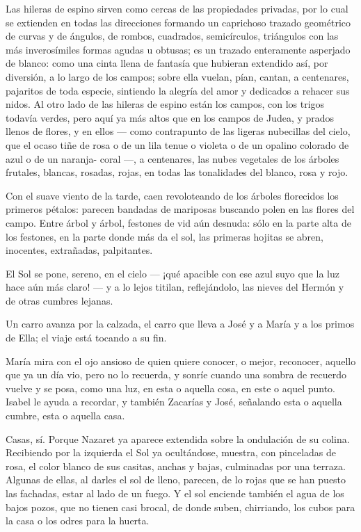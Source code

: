 \documentclass[12pt, twoside, openright]{book} %
\begin{document}
Las hileras de espino sirven como cercas de las propiedades privadas, por lo cual se extienden en todas las direcciones formando un caprichoso trazado geométrico de curvas y de ángulos, de rombos, cuadrados, semicírculos, triángulos con las más inverosímiles formas agudas u obtusas; es un trazado enteramente asperjado de blanco: como una cinta llena de fantasía que hubieran extendido así, por diversión, a lo largo de los campos; sobre ella vuelan, pían, cantan, a centenares, pajaritos de toda especie, sintiendo la alegría del amor y dedicados a rehacer sus nidos. Al otro lado de las hileras de espino están los campos, con los trigos todavía verdes, pero aquí ya más altos que en los campos de Judea, y prados llenos de flores, y en ellos — como contrapunto de las ligeras nubecillas del cielo, que el ocaso tiñe de rosa o de un lila tenue o violeta o de un opalino colorado de azul o de un naranja- coral —, a centenares, las nubes vegetales de los árboles frutales, blancas, rosadas, rojas, en todas las tonalidades del blanco, rosa y rojo. 

Con el suave viento de la tarde, caen revoloteando de los árboles florecidos los primeros pétalos: parecen bandadas de mariposas buscando polen en las flores del campo. Entre árbol y árbol, festones de vid aún desnuda: sólo en la parte alta de los festones, en la parte donde más da el sol, las primeras hojitas se abren, inocentes, extrañadas, palpitantes. 

El Sol se pone, sereno, en el cielo — ¡qué apacible con ese azul suyo que la luz hace aún más claro! — y a lo lejos titilan, reflejándolo, las nieves del Hermón y de otras cumbres lejanas. 

Un carro avanza por la calzada, el carro que lleva a José y a María y a los primos de Ella; el viaje está tocando a su fin. 

María mira con el ojo ansioso de quien quiere conocer, o mejor, reconocer, aquello que ya un día vio, pero no lo recuerda, y sonríe cuando una sombra de recuerdo vuelve y se posa, como una luz, en esta o aquella cosa, en este o aquel punto. Isabel le ayuda a recordar, y también Zacarías y José, señalando esta o aquella cumbre, esta o aquella casa. 

Casas, sí. Porque Nazaret ya aparece extendida sobre la ondulación de su colina. Recibiendo por la izquierda el Sol ya ocultándose, muestra, con pinceladas de rosa, el color blanco de sus casitas, anchas y bajas, culminadas por una terraza. Algunas de ellas, al darles el sol de lleno, parecen, de lo rojas que se han puesto las fachadas, estar al lado de un fuego. Y el sol enciende también el agua de los bajos pozos, que no tienen casi brocal, de donde suben, chirriando, los cubos para la casa o los odres para la huerta. 
\end{document}
